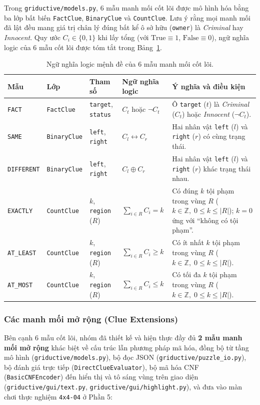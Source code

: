 \documentclass[12pt,a4paper]{article}
\begin{document}
Trong \texttt{griductive/models.py}, 6 mẫu manh mối cốt lõi được mô hình hóa bằng ba lớp bất biến \texttt{FactClue}, \texttt{BinaryClue} và \texttt{CountClue}. Lưu ý rằng mọi manh mối đã lật đều mang giá trị chân lý đúng bất kể ô sở hữu (\texttt{owner}) là \emph{Criminal} hay \emph{Innocent}. Quy ước $C_i \in \{0, 1\}$ khi lấy tổng (với $\text{True} \equiv 1$, $\text{False} \equiv 0$), ngữ nghĩa logic của 6 mẫu cốt lõi được tóm tắt trong Bảng~\ref{tab:core_clues}.

\begin{table}[H]
\centering
\footnotesize
\setlength{\tabcolsep}{4.5pt}
\renewcommand{\arraystretch}{1.25}
\begin{tabular}{@{}llllp{}@{}}
\toprule
\textbf{Mẫu} & \textbf{Lớp} & \textbf{Tham số} & \textbf{Ngữ nghĩa logic} & \textbf{Ý nghĩa và điều kiện} \\
\midrule
\texttt{FACT} & \texttt{FactClue} & \texttt{target}, \texttt{status} &
$C_t$ hoặc $\neg C_t$ &
Ô \texttt{target} ($t$) là \emph{Criminal} ($C_t$) hoặc \emph{Innocent} ($\neg C_t$). \\
\texttt{SAME} & \texttt{BinaryClue} & \texttt{left}, \texttt{right} &
$C_l \leftrightarrow C_r$ &
Hai nhân vật \texttt{left} ($l$) và \texttt{right} ($r$) có cùng trạng thái. \\
\texttt{DIFFERENT} & \texttt{BinaryClue} & \texttt{left}, \texttt{right} &
$C_l \oplus C_r$ &
Hai nhân vật \texttt{left} ($l$) và \texttt{right} ($r$) khác trạng thái nhau. \\
\texttt{EXACTLY} & \texttt{CountClue} & $k$, \texttt{region} ($R$) &
$\sum_{i \in R} C_i = k$ &
Có đúng $k$ tội phạm trong vùng $R$ ($k \in \mathbb{Z},\; 0 \le k \le |R|$); $k=0$ ứng với ``không có tội phạm''. \\
\texttt{AT\_LEAST} & \texttt{CountClue} & $k$, \texttt{region} ($R$) &
$\sum_{i \in R} C_i \ge k$ &
Có ít nhất $k$ tội phạm trong vùng $R$ ($k \in \mathbb{Z},\; 0 \le k \le |R|$). \\
\texttt{AT\_MOST} & \texttt{CountClue} & $k$, \texttt{region} ($R$) &
$\sum_{i \in R} C_i \le k$ &
Có tối đa $k$ tội phạm trong vùng $R$ ($k \in \mathbb{Z},\; 0 \le k \le |R|$). \\
\bottomrule
\end{tabular}
\caption{Ngữ nghĩa logic mệnh đề của 6 mẫu manh mối cốt lõi.}
\label{tab:core_clues}
\end{table}

\subsubsection{Các manh mối mở rộng (Clue Extensions)}
Bên cạnh 6 mẫu cốt lõi, nhóm đã thiết kế và hiện thực đầy đủ \textbf{2 mẫu manh mối mở rộng} khác biệt về cấu trúc lẫn phương pháp mã hóa, đồng bộ từ tầng mô hình (\texttt{griductive/models.py}), bộ đọc JSON (\texttt{griductive/puzzle\_io.py}), bộ đánh giá trực tiếp (\texttt{DirectClueEvaluator}), bộ mã hóa CNF (\texttt{BasicCNFEncoder}) đến hiển thị và tô sáng vùng trên giao diện (\texttt{griductive/gui/text.py}, \texttt{griductive/gui/highlight.py}), và đưa vào màn chơi thực nghiệm \texttt{4x4-04} ở Phần 5:
\end{document}
